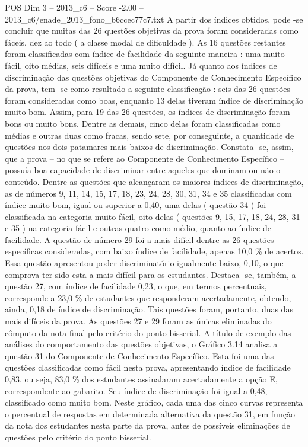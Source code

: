 \begin{textsample}{POS Dim 3 – 2013\_c6 – Score -2.00 – 2013\_c6/enade\_2013\_fono\_b6ccec77c7.txt}
A partir dos índices obtidos, pode -se concluir que muitas das 26 questões objetivas da prova foram consideradas como fáceis, dez ao todo ( a classe modal de dificuldade ).
As 16 questões restantes foram classificadas com índice de facilidade da seguinte maneira : uma muito fácil, oito médias, seis difíceis e uma muito difícil.
Já quanto aos índices de discriminação das questões objetivas do Componente de Conhecimento Específico da prova, tem -se como resultado a seguinte classificação : seis das 26 questões foram consideradas como boas, enquanto 13 delas tiveram índice de discriminação muito bom.
Assim, para 19 das 26 questões, os índices de discriminação foram bons ou muito bons.
Dentre as demais, cinco delas foram classificadas como médias e outras duas como fracas, sendo sete, por conseguinte, a quantidade de questões nos dois patamares mais baixos de discriminação.
Constata -se, assim, que a prova – no que se refere ao Componente de Conhecimento Específico – possuía boa capacidade de discriminar entre aqueles que dominam ou não o conteúdo.
Dentre as questões que alcançaram os maiores índices de discriminação, as de números 9, 11, 14, 15, 17, 18, 23, 24, 28, 30, 31, 34 e 35 classificadas com índice muito bom, igual ou superior a 0,40, uma delas ( questão 34 ) foi classificada na categoria muito fácil, oito delas ( questões 9, 15, 17, 18, 24, 28, 31 e 35 ) na categoria fácil e outras quatro como médio, quanto ao índice de facilidade.
A questão de número 29 foi a mais difícil dentre as 26 questões específicas consideradas, com baixo índice de facilidade, apenas 10,0 \% de acertos.
Essa questão apresentou poder discriminatório igualmente baixo, 0,10, o que comprova ter sido esta a mais difícil para os estudantes.
Destaca -se, também, a questão 27, com índice de facilidade 0,23, o que, em termos percentuais, corresponde a 23,0 \% de estudantes que responderam acertadamente, obtendo, ainda, 0,18 de índice de discriminação.
Tais questões foram, portanto, duas das mais difíceis da prova.
As questões 27 e 29 foram as únicas eliminadas do cômputo da nota final pelo critério do ponto bisserial.
A título de exemplo das análises do comportamento das questões objetivas, o Gráfico 3.14 analisa a questão 31 do Componente de Conhecimento Específico.
Esta foi uma das questões classificadas como fácil nesta prova, apresentando índice de facilidade 0,83, ou seja, 83,0 \% dos estudantes assinalaram acertadamente a opção E, correspondente ao gabarito.
Seu índice de discriminação foi igual a 0,48, classificado como muito bom.
Neste gráfico, cada uma das cinco curvas representa o percentual de respostas em determinada alternativa da questão 31, em função da nota dos estudantes nesta parte da prova, antes de possíveis eliminações de questões pelo critério do ponto bisserial.

\end{textsample}
